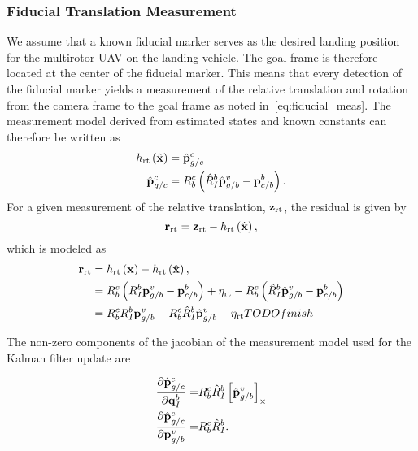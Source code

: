 \subsubsection{Fiducial Translation Measurement}
We assume that a known fiducial marker serves as the desired landing position
for the multirotor UAV on the landing vehicle. The goal frame is therefore
located at the center of the fiducial marker. This means that every detection of the fiducial
marker yields a measurement of the relative translation and rotation from the
camera frame to the goal frame as noted in~\eqref{eq:fiducial_meas}.
The measurement model derived from estimated states and known constants can
therefore be written as
\begin{align}
  h_{\text{rt}} \left( \hat{\boldsymbol{\mathrm{x}}} \right) &=
    \hat{\boldsymbol{\mathrm{p}}}_{g/c}^c \\
  \hat{\boldsymbol{\mathrm{p}}}_{g/c}^c  &= R_b^c \left( \hat{R}_I^b \hat{\boldsymbol{\mathrm{p}}}_{g/b}^v -
    \boldsymbol{\mathrm{p}}_{c/b}^b \right). 
\end{align}
For a given measurement of the relative translation,
$\boldsymbol{\mathrm{z}}_{\text{rt}}$, the residual is given by
\begin{equation*}
  \boldsymbol{\mathrm{r}}_{\text{rt}} = \boldsymbol{\mathrm{z}}_{\text{rt}} - h_{\text{rt}} \left( \hat{\boldsymbol{\mathrm{x}}}
  \right),
\end{equation*}
which is modeled as
\begin{align*}
  \boldsymbol{\mathrm{r}}_{\text{rt}} &=  h_{\text{rt}} \left( \boldsymbol{\mathrm{x}} \right) - h_{\text{rt}} \left( \hat{\boldsymbol{\mathrm{x}}}
  \right), \\
                       &= R_b^c \left( R_I^b \boldsymbol{\mathrm{p}}_{g/b}^v -
                         \boldsymbol{\mathrm{p}}_{c/b}^b \right)  +\eta_{\text{rt}} - R_b^c \left( \hat{R}_I^b \hat{\boldsymbol{\mathrm{p}}}_{g/b}^v -
    \boldsymbol{\mathrm{p}}_{c/b}^b \right)  \\
                       &= R_b^c R_I^b \boldsymbol{\mathrm{p}}_{g/b}^v 
                          - R_b^c \hat{R}_I^b \hat{\boldsymbol{\mathrm{p}}}_{g/b}^v + \eta_{\text{rt}}
                          TODO finish
\end{align*}


The non-zero components of the jacobian of the measurement model used for the
Kalman filter update are

\begin{align}
  \frac{\partial \hat{\boldsymbol{\mathrm{p}}}_{g/c}^c}{\partial \boldsymbol{\mathrm{q}}_I^b} =& R_b^c 
  \hat{R}_I^b \left[ \hat{\boldsymbol{\mathrm{p}}}_{g/b}^v \right]_{\times} \\
    \frac{\partial \hat{\boldsymbol{\mathrm{p}}}_{g/c}^c}{\partial \boldsymbol{\mathrm{p}}_{g/b}^v} =& R_b^c
    \hat{R}_I^b.
\end{align}

